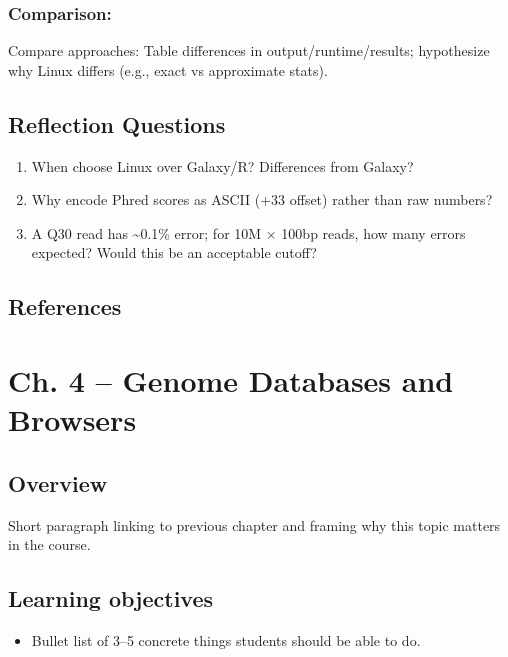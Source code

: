 \documentclass[
  letterpaper,
  DIV=11,
  numbers=noendperiod]{scrreprt}
\providecommand{\tightlist}{%
  \setlength{\itemsep}{0pt}\setlength{\parskip}{0pt}}
\begin{document}
\subsection{Comparison:}\label{comparison}

Compare approaches: Table differences in output/runtime/results;
hypothesize why Linux differs (e.g., exact vs approximate stats).

\section{Reflection Questions}\label{reflection-questions}

\begin{enumerate}
\def\labelenumi{\arabic{enumi}.}
\item
  When choose Linux over Galaxy/R? Differences from Galaxy?
\item
  Why encode Phred scores as ASCII (+33 offset) rather than raw
  numbers?\hspace{0pt}
\item
  A Q30 read has \textasciitilde0.1\% error; for 10M × 100bp reads, how
  many errors expected? Would this be an acceptable cutoff?
\end{enumerate}

\section{References}\label{references}


\chapter{Ch. 4 -- Genome Databases and
Browsers}\label{ch.-4-genome-databases-and-browsers}

\section{Overview}\label{overview}

Short paragraph linking to previous chapter and framing why this topic
matters in the course.

\section{Learning objectives}\label{learning-objectives}

\begin{itemize}
\tightlist
\item
  Bullet list of 3--5 concrete things students should be able to do.
\end{itemize}
\end{document}
